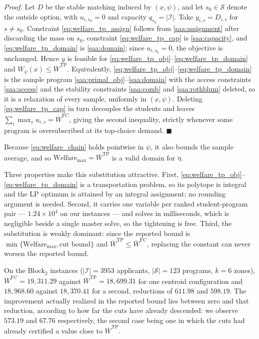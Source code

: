 \documentclass{article}
\begin{document}
\textit{Proof.} Let $D$ be the stable matching induced by $(x, \psi)$, and let $s_0 \in \mathcal{S}$ denote the outside option, with $u_{i, s_0} = 0$ and capacity $q_{s_0} = |\mathcal{I}|$. Take $y_{i,s} = D_{i,s}$ for $s \neq s_0$. Constraint \eqref{eq:welfare_tp_assign} follows from \eqref{saa:assignment} after discarding the mass on $s_0$, constraint \eqref{eq:welfare_tp_cap} is \eqref{saa:capacity}, and \eqref{eq:welfare_tp_domain} is \eqref{saa:domain}; since $u_{i,s_0} = 0$, the objective is unchanged. Hence $y$ is feasible for \eqref{eq:welfare_tp_obj}--\eqref{eq:welfare_tp_domain} and $W_\psi(x) \leq \overline{W}^{\mathrm{TP}}$. Equivalently, \eqref{eq:welfare_tp_obj}--\eqref{eq:welfare_tp_domain} is the sample program \eqref{saa:primal_obj}--\eqref{saa:domain} with the access constraints \eqref{saa:access} and the stability constraints \eqref{saa:comb} and \eqref{saa:rothblum} deleted, so it is a relaxation of every sample, uniformly in $(x, \psi)$. Deleting \eqref{eq:welfare_tp_cap} in turn decouples the students and leaves $\sum_i \max_s u_{i,s} = \overline{W}^{\mathrm{FC}}$, giving the second inequality, strictly whenever some program is oversubscribed at its top-choice demand. $\blacksquare$

Because \eqref{eq:welfare_chain} holds pointwise in $\psi$, it also bounds the sample average, and so $\text{Welfare}_{\max} = \overline{W}^{\mathrm{TP}}$ is a valid domain for $\eta$.

Three properties make this substitution attractive. First, \eqref{eq:welfare_tp_obj}--\eqref{eq:welfare_tp_domain} is a transportation problem, so its polytope is integral and the LP optimum is attained by an integral assignment; no rounding argument is needed. Second, it carries one variable per ranked student-program pair --- $1.24 \times 10^4$ on our instances --- and solves in milliseconds, which is negligible beside a single master solve, so the tightening is free. Third, the substitution is weakly dominant: since the reported bound is $\min\{\text{Welfare}_{\max}, \text{cut bound}\}$ and $\overline{W}^{\mathrm{TP}} \leq \overline{W}^{\mathrm{FC}}$, replacing the constant can never worsen the reported bound.

On the $\text{Block}_2$ instances ($|\mathcal{I}| = 3953$ applicants, $|\mathcal{S}| = 123$ programs, $k = 6$ zones), $\overline{W}^{\mathrm{FC}} = 19{,}311.29$ against $\overline{W}^{\mathrm{TP}} = 18{,}699.31$ for one centroid configuration and $18{,}968.60$ against $18{,}370.41$ for a second, reductions of $611.98$ and $598.19$. The improvement actually realized in the reported bound lies between zero and that reduction, according to how far the cuts have already descended: we observe $573.19$ and $67.76$ respectively, the second case being one in which the cuts had already certified a value close to $\overline{W}^{\mathrm{TP}}$.
\end{document}
